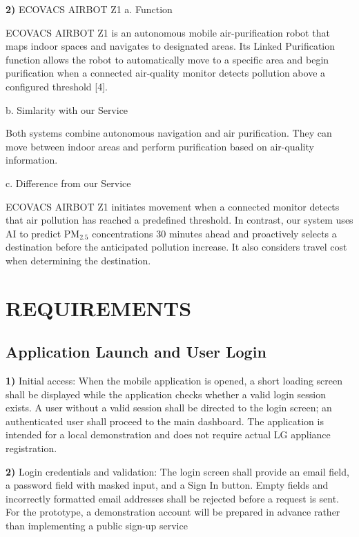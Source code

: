 \documentclass[conference]{IEEEtran}
\begin{document}
\par\noindent\textbf{2)} ECOVACS AIRBOT Z1
a. Function

ECOVACS AIRBOT Z1 is an autonomous mobile air-purification robot that maps indoor spaces and navigates to designated areas. Its Linked Purification function allows the robot to automatically move to a specific area and begin purification when a connected air-quality monitor detects pollution above a configured threshold [4].

b. Simlarity with our Service

Both systems combine autonomous navigation and air purification. They can move between indoor areas and perform purification based on air-quality information.

c. Difference from our Service

ECOVACS AIRBOT Z1 initiates movement when a connected monitor detects that air pollution has reached a predefined threshold. In contrast, our system uses AI to predict PM$_{2.5}$ concentrations 30 minutes ahead and proactively selects a destination before the anticipated pollution increase. It also considers travel cost when determining the destination.

\section{REQUIREMENTS}
\subsection{Application Launch and User Login}
\par\noindent\textbf{1)} Initial access:
When the mobile application is opened, a short loading screen shall be displayed while the application checks whether a valid login session exists. A user without a valid session shall be directed to the login screen; an authenticated user shall proceed to the main dashboard. The application is intended for a local demonstration and does not require actual LG appliance registration.

\par\noindent\textbf{2)} Login credentials and validation:
The login screen shall provide an email field, a password field with masked input, and a Sign In button. Empty fields and incorrectly formatted email addresses shall be rejected before a request is sent. For the prototype, a demonstration account will be prepared in advance rather than implementing a public sign-up service
\end{document}
